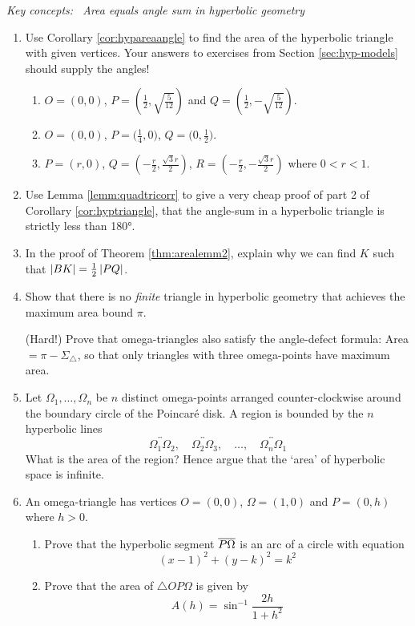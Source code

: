 \begin{exercises}
	\hangindent\leftmargini\emph{Key concepts: \ Area equals angle sum in hyperbolic geometry}


	\begin{enumerate}
	  \item Use Corollary \ref{cor:hypareaangle} to find the area of the hyperbolic triangle with given vertices. Your answers to exercises from Section \ref{sec:hyp-models} should supply the angles!
	  \begin{enumerate}
	    \item $O=(0,0)$, $P=\left(\frac 12,\sqrt{\frac 5{12}}\right)$ and $Q=\left(\frac 12,-\sqrt{\frac 5{12}}\right)$.
	    \item $O=(0,0)$, $P=\big(\frac 14,0\big)$, $Q=\big(0,\frac 12\big)$.
	    \item $P=(r,0)$, $Q=\left(-\frac r2,\frac{\sqrt{3}r}2\right)$, $R=\left(-\frac r2,-\frac{\sqrt{3}r}2\right)$ where $0<r<1$.
		\end{enumerate}
		
		
		\item Use Lemma \ref{lemm:quadtricorr} to give a very cheap proof of part 2 of Corollary \ref{cor:hyptriangle}, that the angle-sum in a hyperbolic triangle is strictly less than \ang{180}.
		
		
		\item In the proof of Theorem \ref{thm:arealemm2}, explain why we can find $K$ such that $\left| BK\right|=\frac 12\left| PQ\right|$. 
		
   
	  \item Show that there is no \emph{finite} triangle in hyperbolic geometry that achieves the maximum area bound $\pi$.\par
	  (Hard!) Prove that omega-triangles also satisfy the angle-defect formula: Area $=\pi-\Sigma_{\triangle}$, so that only triangles with three omega-points have maximum area.
	
	
		\item Let $\Omega_1,\ldots,\Omega_n$ be $n$ distinct omega-points arranged counter-clockwise around the boundary circle of the Poincaré disk. A region is bounded by the $n$ hyperbolic lines
		\[
			\overleftrightarrow{\Omega_1\Omega_2},\quad \overleftrightarrow{\Omega_2\Omega_3},\quad\ldots,\quad\overleftrightarrow{\Omega_n\Omega_1}
		\]
		What is the area of the region? Hence argue that the `area' of hyperbolic space is infinite.
	  
	  
	  \item An omega-triangle has vertices $O=(0,0)$, $\Omega=(1,0)$ and $P=(0,h)$ where $h>0$.
	  \begin{enumerate}
	    \item Prove that the hyperbolic segment $\overline{P\Omega}$ is an arc of a circle with equation
	    \[
	    	(x-1)^2+(y-k)^2=k^2 \tag{some $k>0$}
	    \]
	    \item Prove that the area of $\triangle OP\Omega$ is given by
			\[
				A(h)=\sin^{-1}\dfrac{2h}{1+h^2}
			\]
		\end{enumerate}
		

\end{enumerate}
\end{exercises}
